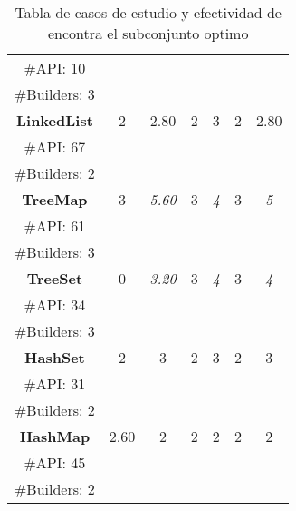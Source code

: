 \begin{table}[H]
\begin{tabular}{c ccccccc}
\multicolumn{2}{c}{\tiny \#API: 10} &  &   & &   & & \\
\multicolumn{2}{c}{\tiny \#Builders: 3} &  &   & &   & & \\
\midrule\multicolumn{2}{c}{\textbf{LinkedList}} & 2 &  2.80 &  2 &  3 &2  &  2.80  \\
\multicolumn{2}{c}{\tiny \#API: 67} &  &   & &   & & \\
\multicolumn{2}{c}{\tiny \#Builders: 2} &  &   & &   & & \\
\midrule
\multicolumn{2}{c}{\textbf{TreeMap}} &  3 & \cellcolor{gray!25}\emph{5.60}  &  3 &  \cellcolor{gray!25} \emph{4}  &3 & \cellcolor{gray!25}\emph{5}   \\
\multicolumn{2}{c}{\tiny \#API: 61} &  &   & &   & & \\
\multicolumn{2}{c}{\tiny \#Builders: 3} &  &   & &   & & \\
\midrule
\multicolumn{2}{c}{\textbf{TreeSet}} &  0&\cellcolor{gray!25} \emph{3.20}  &  3 &   \cellcolor{gray!25}\emph{4}  & 3 & \cellcolor{gray!25}\emph{4}   \\
\multicolumn{2}{c}{\tiny \#API: 34} &  &   & &   & & \\
\multicolumn{2}{c}{\tiny \#Builders: 3} &  &   & &   & & \\
\midrule
\multicolumn{2}{c}{\textbf{HashSet}} &  2 &3  &  2 &  3& 2  &  3 \\
\multicolumn{2}{c}{\tiny \#API: 31} &  &   & &   & & \\
\multicolumn{2}{c}{\tiny \#Builders: 2} &  &   & &   & & \\
\midrule
\multicolumn{2}{c}{\textbf{HashMap}} & 2.60  & 2  &2   &2   &  2 & 2   \\
\multicolumn{2}{c}{\tiny \#API: 45} &  &   & &   & & \\
\multicolumn{2}{c}{\tiny \#Builders: 2} &  &   & &   & & \\
\hline
\end{tabular}

\caption{Tabla de casos de estudio y efectividad de encontra el subconjunto optimo}
\label{tab:efectividad}
\end{table}

